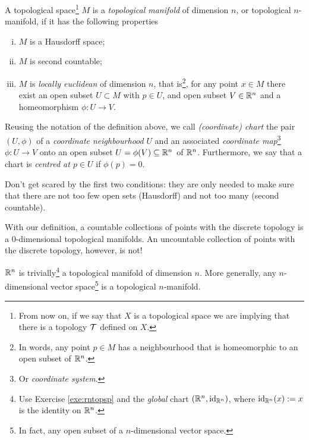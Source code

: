 \begin{definition}
  A topological space\footnote{From now on, if we say that $X$ is a topological space we are implying that there is a topology $\mathcal{T}$ defined on $X$.} $M$ is a \emph{topological manifold} of dimension $n$, or topological $n$-manifold, if it has the following properties
  \begin{enumerate}[(i)]
    \item $M$ is a Hausdorff space;
    \item $M$ is second countable;
    \item $M$ is \emph{locally euclidean} of dimension $n$, that is\footnote{In words, any point $p\in M$ has a neighbourhood that is homeomorphic to an open subset of $\mathbb{R}^n$.}, for any point $x\in M$ there exist an open subset $U\subset M$ with $p\in U$, and open subset $V\in\mathbb{R}^n$ and a homeomorphism $\phi: U\to V$.
  \end{enumerate}
\end{definition}

\begin{notation}
  Reusing the notation of the definition above, we call \emph{(coordinate) chart} the pair $(U, \phi)$ of a \emph{coordinate neighbourhood} $U$ and an associated \emph{coordinate map}\footnote{Or \emph{coordinate system}.} $\phi: U\to V$ onto an open subset $U=\phi(V)\subseteq\mathbb{R}^n$ of $\mathbb{R}^n$.
  Furthermore, we say that a chart is \emph{centred at $p\in U$} if $\phi(p) = 0$.
\end{notation}

Don't get scared by the first two conditions: they are only needed to make sure that there are not too few open sets (Hausdorff) and not too many (second countable).

\begin{example}
  With our definition, a countable collections of points with the discrete topology is a $0$-dimensional topological manifolds.
  An uncountable collection of points with the discrete topology, however, is not!
\end{example}

\begin{example}
  $\mathbb{R}^n$ is trivially\footnote{Use Exercise \ref{exe:rntopsp} and the \emph{global} chart $(\mathbb{R}^n, \operatorname{id}_{\mathbb{R}^n})$, where $\operatorname{id}_{\mathbb{R}^n}(x) := x$ is the identity on $\mathbb{R}^n$.} a topological manifold of dimension $n$.
  More generally, any $n$-dimensional vector space\footnote{In fact, any open subset of a $n$-dimensional vector space.} is a topological $n$-manifold.
\end{example}

